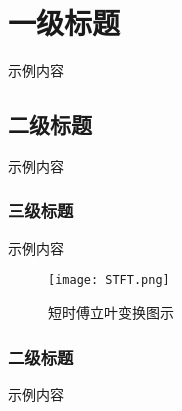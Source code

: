 \section{一级标题}
示例内容

\subsection{二级标题}
示例内容
\subsubsection{三级标题}
示例内容\cite{10.1007/978-3-662-44848-9_34}
\begin{figure}[ht]
    \begin{center}
                    
            \texttt{[image: STFT.png]}
            \caption{短时傅立叶变换图示}
    
    \end{center} 
\end{figure}

\subsubsection{二级标题}
示例内容
